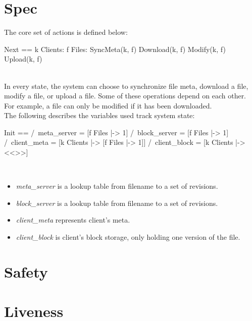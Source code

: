\section{Spec}

The core set of actions is defined below:\\
\begin{tla}
Next ==
    \/ \E k \in Clients: 
        \E f \in Files: 
            \/ SyncMeta(k, f)
            \/ Download(k, f)
            \/ Modify(k, f)
            \/ Upload(k, f)
\end{tla}
\begin{tlatex}
%
%
%
%
%
%
%
\end{tlatex}
\\

In every state, the system can choose to synchronize file meta, download a file,
modify a file, or upload a file. Some of these operations depend on each other.
For example, a file can only be modified if it has been downloaded.\\ 

The following describes the variables used track system state:\\
\begin{tla}
Init ==
    /\ meta_server = [f \in Files |-> {1}]
    /\ block_server = [f \in Files |-> {1}]
    /\ client_meta = [k \in Clients |-> [f \in Files |-> {1}]]
    /\ client_block = [k \in Clients |-> <<>>]
\end{tla}
\begin{tlatex}
%
\end{tlatex}\\

\begin{itemize}
    \item \textit{meta\_server} is a lookup table from filename to a set of revisions.
    \item \textit{block\_server} is a lookup table from filename to a set of revisions.
    \item \textit{client\_meta} represents client's meta.
    \item \textit{client\_block} is client's block storage, only holding one version of the file. 
\end{itemize}

\section{Safety}

\section{Liveness}

% 

